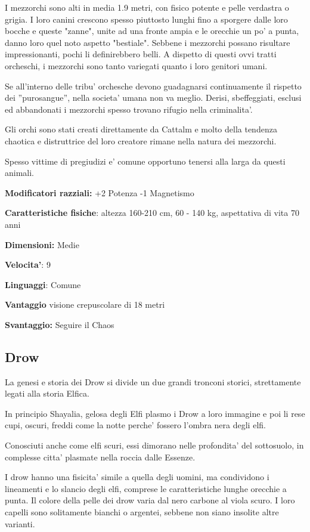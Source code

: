 \documentclass[a4paper,11pt,twoside,openany]{book}
\begin{document}
	I mezzorchi sono alti in media 1.9 metri, con fisico potente e pelle verdastra o grigia. I loro canini crescono spesso piuttosto lunghi fino a sporgere dalle loro bocche e queste "zanne", unite ad una fronte ampia e le orecchie un po' a punta, danno loro quel noto aspetto "bestiale". Sebbene i mezzorchi possano risultare impressionanti, pochi li definirebbero belli. A dispetto di questi ovvi tratti orcheschi, i mezzorchi sono tanto variegati quanto i loro genitori umani.
	
	Se all'interno delle tribu' orchesche devono guadagnarsi continuamente il rispetto dei ''purosangue'', nella societa' umana non va meglio. Derisi, sbeffeggiati, esclusi ed abbandonati i mezzorchi spesso trovano rifugio nella criminalita'.
	
	Gli orchi sono stati creati direttamente da Cattalm e molto della tendenza chaotica e distruttrice del loro creatore rimane nella natura dei mezzorchi.
	
	Spesso vittime di pregiudizi e' comune opportuno tenersi alla larga da questi animali.
	
	\textbf{Modificatori razziali:} +2 Potenza -1 Magnetismo
	
	\textbf{Caratteristiche fisiche}: altezza 160-210 cm, 60 - 140 kg,
	aspettativa di vita 70 anni
	
	\textbf{Dimensioni:} Medie
	
	\textbf{Velocita'}: 9
	
	\textbf{Linguaggi}: Comune
	
	\textbf{Vantaggio} visione crepuscolare di 18 metri
	
	\textbf{Svantaggio:} Seguire il Chaos
	
	\subsection{Drow}
	
	\label{drow}
	
	La genesi e storia dei Drow si divide un due grandi tronconi storici, strettamente legati alla storia Elfica.
	
	In principio Shayalia, gelosa degli Elfi plasmo i Drow a loro immagine e poi li rese cupi, oscuri, freddi come la notte perche' fossero l'ombra nera degli elfi.
	
	Conosciuti anche come elfi scuri, essi dimorano nelle profondita' del sottosuolo, in complesse citta' plasmate nella roccia dalle Essenze.
	
	I drow hanno una fisicita' simile a quella degli uomini, ma condividono i lineamenti e lo slancio degli elfi, comprese le caratteristiche lunghe orecchie a punta. Il colore della pelle dei drow varia dal nero carbone al viola scuro. I loro capelli sono solitamente bianchi o argentei, sebbene non siano insolite altre varianti.
	
\end{document}
